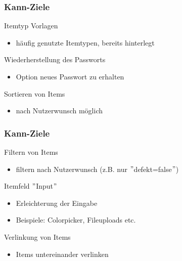 \documentclass{beamer}
\begin{document}
\begin{frame}
\frametitle{Kann-Ziele}

\begin{block}{Itemtyp Vorlagen}
\begin{itemize}
\item häufig genutzte Itemtypen, bereits hinterlegt
\end{itemize}
\end{block}

\begin{block}{Wiederherstellung des Passworts}
\begin{itemize}
\item Option neues Passwort zu erhalten
\end{itemize}
\end{block}

\begin{block}{Sortieren von Items}
\begin{itemize}
\item nach Nutzerwunsch möglich
\end{itemize}
\end{block}

\end{frame}

\begin{frame}
\frametitle{Kann-Ziele}
\begin{block}{Filtern von Items}
\begin{itemize}
\item filtern nach Nutzerwunsch (z.B. nur $"$defekt=false$"$)
\end{itemize}
\end{block}

\begin{block}{Itemfeld $"$Input$"$}
\begin{itemize}
\item Erleichterung der Eingabe
\item Beispiele: Colorpicker, Fileuploads etc.
\end{itemize}
\end{block}

\begin{block}{Verlinkung von Items}
\begin{itemize}
\item Items untereinander verlinken
\end{itemize}
\end{block}

\end{frame}
\end{document}
